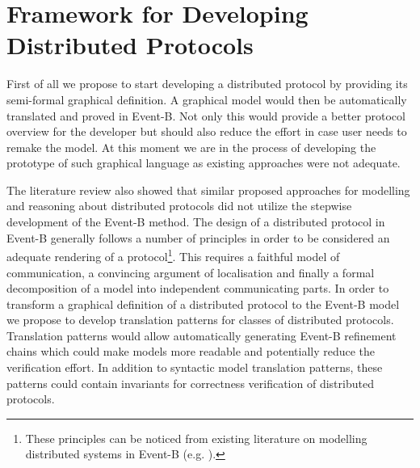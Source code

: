 \documentclass{llncs}
\begin{document}
	
	
	
	
	
	
	
	
	
	
	\section{Framework for Developing Distributed Protocols}
	First of all we propose to start developing a distributed protocol by providing its semi-formal graphical definition. A graphical model would then be automatically translated and proved in Event-B. Not only this would provide a better protocol overview for the developer but should also reduce the effort in case user needs to remake the model. At this moment we are in the process of developing the prototype of such graphical language as existing approaches were not adequate. 
	
	The literature review also showed that similar proposed approaches for modelling and reasoning about distributed protocols did not utilize the stepwise development of the Event-B method. The design of a distributed protocol in Event-B generally follows a number of principles in order to be considered an adequate rendering of a protocol\footnote{These principles can be noticed from existing literature on modelling distributed systems in Event-B (e.g. \cite{Cansell} \cite{Hoang} \cite{Yadav}).}. This requires a faithful model of communication, a convincing argument of localisation and finally a formal decomposition of a model into independent communicating parts. In order to transform a graphical definition of a distributed protocol to the Event-B model we propose to develop translation patterns for classes of distributed protocols. Translation patterns would allow automatically generating Event-B refinement chains which could make models more readable and potentially reduce the verification effort. In addition to syntactic model translation patterns, these patterns could contain invariants for correctness verification of distributed protocols. 
	
\end{document}
